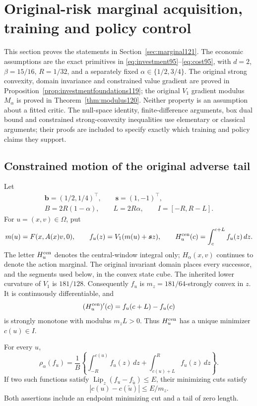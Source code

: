 \section{Original-risk marginal acquisition, training and policy control}
\label{supp:marginal121}

This section proves the statements in Section~\ref{sec:marginal121}.
The economic assumptions are the exact primitives in
\eqref{eq:investment95}--\eqref{eq:cost95}, with \(d=2\),
\(\beta=15/16\), \(R=1/32\), and a separately fixed
\(\alpha\in\{1/2,3/4\}\).
The original strong convexity, domain invariance and constrained value
gradient are proved in Proposition~\ref{prop:investmentfoundations119};
the original \(V_1\) gradient modulus \(M_\alpha\) is proved in
Theorem~\ref{thm:modulus120}.
Neither property is an assumption about a fitted critic.
The null-space identity, finite-difference arguments, box dual bound
and constrained strong-convexity inequalities use elementary or
classical arguments; their proofs are included to specify exactly
which training and policy claims they support.

\subsection{Constrained motion of the original adverse tail}

Let
\begin{gather*}
 \boldsymbol b=(1/2,1/4)^\top,\qquad
 \boldsymbol s=(1,-1)^\top,\\
 B=2R(1-\alpha),\qquad L=2R\alpha,\qquad
 I=[-R,R-L].
\end{gather*}
For \(u=(x,v)\in\Omega\), put
\[
 m(u)=F(x,A(x)v,0),\qquad
 f_u(z)=V_1(m(u)+\boldsymbol s z),\qquad
 H_u^{\rm cen}(c)=\int_c^{c+L}f_u(z)\,dz .
\]
The letter \(H_u^{\rm cen}\) denotes the central-window integral
only; \(H_\alpha(x,v)\) continues to denote the action marginal.
The original invariant domain places every successor, and the
segments used below, in the convex state cube.
The inherited lower curvature of \(V_1\) is \(181/128\).
Consequently \(f_u\) is \(m_z=181/64\)-strongly convex in \(z\).
It is continuously differentiable, and
\[
 (H_u^{\rm cen})'(c)=f_u(c+L)-f_u(c)
\]
is strongly monotone with modulus \(m_zL>0\).
Thus \(H_u^{\rm cen}\) has a unique minimizer \(c(u)\in I\).

\begin{lemma}
\label{lem:cutmarginal121}
For every \(u\),
\begin{equation}\label{eq:tailmarginal121}
 \rho_\alpha(f_u)=\frac1B
       \left\{\int_{-R}^{c(u)}f_u(z)\,dz+
                         \int_{c(u)+L}^{R}f_u(z)\,dz\right\}.
\end{equation}
If two such functions satisfy
\(\operatorname{Lip}_z(f_u-f_{\widetilde u})\leq E\), their
minimizing cuts satisfy
\[
 |c(u)-c(\widetilde u)|\leq E/m_z.
\]
Both assertions include an endpoint minimizing cut and a tail of
zero length.
\end{lemma}

